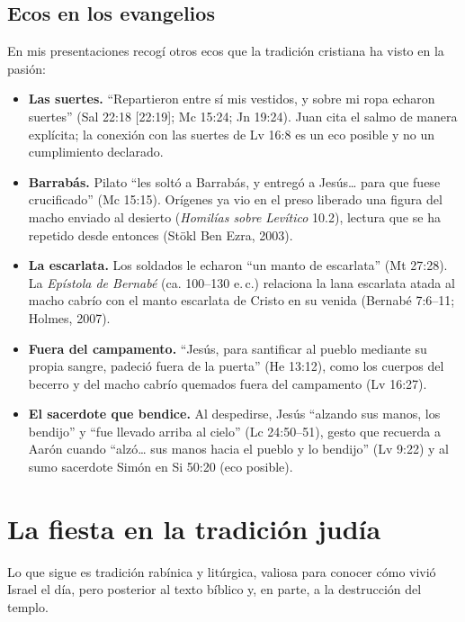 \documentclass[11pt,letterpaper]{article}
\begin{document}
\subsection{Ecos en los evangelios}
En mis presentaciones recogí otros ecos que la tradición cristiana ha visto en la pasión:
\begin{itemize}\setlength{\itemsep}{2pt}
\item \textbf{Las suertes.} ``Repartieron entre sí mis vestidos, y sobre mi ropa echaron suertes'' (Sal 22:18 [22:19]; Mc 15:24; Jn 19:24). Juan cita el salmo de manera explícita; la conexión con las suertes de Lv 16:8 es un eco posible y no un cumplimiento declarado.
\item \textbf{Barrabás.} Pilato ``les soltó a Barrabás, y entregó a Jesús\ldots{} para que fuese crucificado'' (Mc 15:15). Orígenes ya vio en el preso liberado una figura del macho enviado al desierto (\emph{Homilías sobre Levítico} 10.2), lectura que se ha repetido desde entonces (Stökl Ben Ezra, 2003).
\item \textbf{La escarlata.} Los soldados le echaron ``un manto de escarlata'' (Mt 27:28). La \emph{Epístola de Bernabé} (ca. 100--130 e.\,c.) relaciona la lana escarlata atada al macho cabrío con el manto escarlata de Cristo en su venida (Bernabé 7:6--11; Holmes, 2007).
\item \textbf{Fuera del campamento.} ``Jesús, para santificar al pueblo mediante su propia sangre, padeció fuera de la puerta'' (He 13:12), como los cuerpos del becerro y del macho cabrío quemados fuera del campamento (Lv 16:27).
\item \textbf{El sacerdote que bendice.} Al despedirse, Jesús ``alzando sus manos, los bendijo'' y ``fue llevado arriba al cielo'' (Lc 24:50--51), gesto que recuerda a Aarón cuando ``alzó\ldots{} sus manos hacia el pueblo y lo bendijo'' (Lv 9:22) y al sumo sacerdote Simón en Si 50:20 (eco posible).
\end{itemize}

\section{La fiesta en la tradición judía}\label{sec:tradicion}

Lo que sigue es tradición rabínica y litúrgica, valiosa para conocer cómo vivió Israel el día, pero posterior al texto bíblico y, en parte, a la destrucción del templo.
\end{document}
